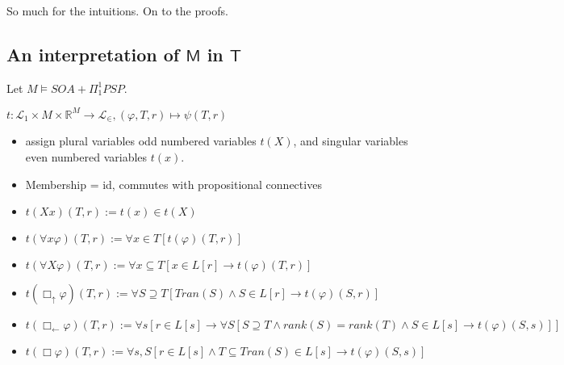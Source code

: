 \documentclass{article}
\theoremstyle{definition}
\newcommand{\bu}{\Box_\uparrow}
\newcommand{\bl}{\Box_\leftarrow}
\begin{document}
So much for the intuitions. On to the proofs.

\subsection{An interpretation of $\mathsf{M}$ in $\mathsf{T}$}
 Let $M \vDash SOA + \Pi_1^1 PSP$.

$t : \mathcal{L}_1 \times M \times \mathbb{R}^M \to \mathcal{L}_\in, (\varphi, T, r) \mapsto \psi(T, r)$
\begin{itemize}
    \item assign plural variables odd numbered variables $t(X)$, and singular variables even 
            numbered variables $t(x)$.
    \item Membership = id, commutes with propositional connectives 
    \item $t(Xx)(T, r) := t(x) \in t(X)$
    \item $t(\forall x \varphi)(T, r) := \forall x \in T [t(\varphi)(T, r)]$
    \item $t(\forall X \varphi)(T, r) := \forall x \subseteq T [x \in L[r] \rightarrow t(\varphi)(T, r)]$
    \item $t(\bu \varphi)(T, r) := \forall S \supseteq T [Tran(S) \wedge S \in L[r] \rightarrow t(\varphi)(S, r)]$
    \item $t(\bl \varphi)(T, r) := \forall s[ r \in L[s] \rightarrow \forall S[ S \supseteq T \wedge rank(S) = rank(T) \wedge S \in L[s] \rightarrow t(\varphi)(S, s)]]$
    \item $t(\Box \varphi)(T, r) := \forall s, S[r \in L[s] \wedge T \subseteq Tran(S) \in L[s]  \rightarrow t(\varphi)(S, s) ]$
\end{itemize}
\end{document}
